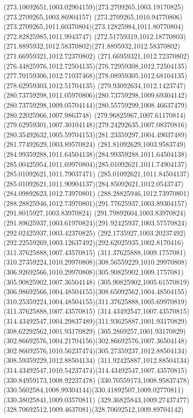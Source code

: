 {{\curveto(273.10692651,1003.02904159)(273.2709265,1003.19170825)(273.2709265,1003.86904157)
\lineto(273.2709265,1010.94770806)
\curveto(273.2709265,1011.60370804)(273.12825984,1011.80770804)(272.82825985,1011.9943747)
\curveto(272.51759319,1012.18770803)(271.8895932,1012.58370802)(271.8895932,1012.58370802)
\lineto(271.66959321,1012.72370802)
\curveto(271.66959321,1012.72370802)(276.44825976,1012.72504135)(276.72959308,1012.72504135)
\curveto(277.70159306,1012.71037468)(278.08959305,1012.68104135)(278.62959303,1012.51704135)
\curveto(279.93092634,1012.1423747)(280.73759298,1011.05970806)(280.73759298,1009.69304142)
\curveto(280.73759298,1009.05704144)(280.55759299,1008.46637479)(280.22025966,1007.9863748)
\curveto(279.96825967,1007.61170814)(279.62959301,1007.30104148)(279.24292635,1007.08370816)
\curveto(280.35492632,1005.59704153)(281.23359297,1004.49037489)(281.77492629,1003.89570824)
\curveto(281.81092629,1003.9583749)(284.99359288,1011.64504138)(284.99359288,1011.64504138)
\curveto(285.00425954,1011.69970804)(285.01092621,1011.74904137)(285.01092621,1011.79037471)
\curveto(285.01092621,1011.84504137)(285.01092621,1011.90904137)(284.85092621,1012.0543747)
\lineto(284.09892623,1012.73970801)
\lineto(288.28825946,1012.73970801)
\curveto(288.28825946,1012.73970801)(291.77625937,1003.89304157)(291.8015927,1003.83970824)
\lineto(291.79892604,1003.83970824)
\curveto(291.89625937,1003.61970824)(291.92425937,1003.57570824)(292.02425937,1003.42370825)
\curveto(292.1735927,1003.20237492)(292.22559269,1003.12637492)(292.62025935,1002.8170416)
\moveto(311.37625888,1007.43570815)
\curveto(311.37625888,1009.1757081)(310.27359224,1010.29970808)(308.56559229,1010.29970808)
\curveto(306.92692566,1010.29970808)(305.90825902,1009.1757081)(305.90825902,1007.36504148)
\curveto(305.90825902,1005.61570819)(306.98692566,1004.48504155)(308.65092562,1004.48504155)
\curveto(310.25359224,1004.48504155)(311.37625888,1005.69970819)(311.37625888,1007.43570815)
\moveto(314.43492547,1007.43570815)
\curveto(314.43492547,1004.29837489)(311.93625887,1001.93170829)(308.62292562,1001.93170829)
\curveto(305.2869257,1001.93170829)(302.86692576,1004.21704156)(302.86692576,1007.36504148)
\curveto(302.86692576,1010.56237474)(305.27359237,1012.88504134)(308.59359229,1012.88504134)
\curveto(311.92425887,1012.88504134)(314.43492547,1010.54237474)(314.43492547,1007.43570815)
\moveto(330.84959173,1008.92237478)
\curveto(330.70559173,1008.95837478)(330.5602584,1008.99304144)(330.41892507,1009.02770811)
\lineto(330.38025841,1009.03570811)
\curveto(329.36825843,1009.27437477)(328.70692512,1009.4637081)(328.70692512,1009.89704142)
}}
